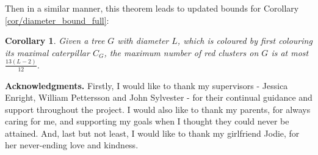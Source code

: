 \documentclass{mpaper}
\newtheorem{corollary}{Corollary}[section]
\begin{document}
  Then in a similar manner, this theorem leads to updated bounds for Corollary \ref{cor/diameter_bound_full}:

\begin{corollary}
\label{cor/diameter_bound_full_2}
Given a tree $G$ with diameter $L$, which is coloured by first colouring its maximal caterpillar $C_G$, the maximum number of red clusters on $G$ is at most $\frac{13(L-2)}{12}$.

\end{corollary}




{\bf Acknowledgments.}
Firstly, I would like to thank my supervisors - Jessica Enright, William Pettersson and John Sylvester - for their continual guidance and support throughout the project. I would also like to thank my parents, for always caring for me, and supporting my goals when I thought they could never be attained. And, last but not least, I would like to thank my girlfriend Jodie, for her never-ending love and kindness.



\end{document}
